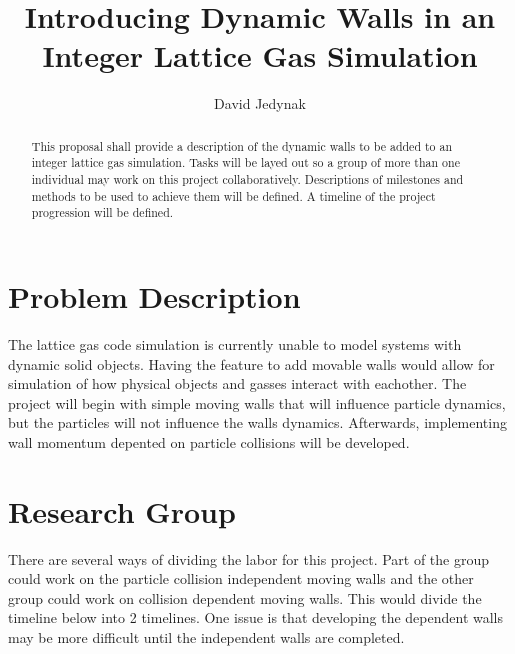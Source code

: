 \documentclass{article}
\begin{document}
\lstset{language=C} 
\title{Introducing Dynamic Walls in an Integer Lattice Gas Simulation}
\author{David Jedynak}
\maketitle
\begin{abstract}
This proposal shall provide a description of the dynamic walls to be added to an integer lattice gas simulation. Tasks will be layed out so  a group of more than one individual may work on this project collaboratively. Descriptions of milestones and methods to be used to achieve them will be defined. A timeline of the project progression will be defined.
\end{abstract}
\section{Problem Description}
The lattice gas code simulation is currently unable to model systems with dynamic solid objects. Having the feature to add movable walls would allow for simulation of how physical objects and gasses interact with eachother. The project will begin with simple moving walls that will influence particle dynamics, but the particles will not influence the walls dynamics. Afterwards, implementing wall momentum depented on particle collisions will be developed.
\section{Research Group}
There are several ways of dividing the labor for this project. Part of the group could work on the particle collision independent moving walls and the other group could work on collision dependent moving walls. This would divide the timeline below into 2 timelines. One issue is that developing the dependent walls may be more difficult until the independent walls are completed. 
\end{document}

